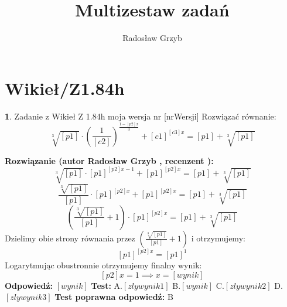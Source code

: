 \documentclass[12pt, a4paper]{article}
\title{Multizestaw zadań}
\author{Radosław Grzyb}
\date{}
\theoremstyle{definition} %
\newtheorem{zad}{}
\newcommand{\kategoria}[1]{\section{#1}} %
\newcommand{\zadStart}[1]{\begin{zad}#1\newline} %
\newcommand{\zadStop}{\end{zad}}   %
\newcommand{\rozwStart}[2]{\noindent \textbf{Rozwiązanie (autor #1 , recenzent #2): }\newline} %
\newcommand{\rozwStop}{\newline}                                            %
\newcommand{\odpStart}{\noindent \textbf{Odpowiedź:}\newline}    %
\newcommand{\odpStop}{\newline}                                             %
\newcommand{\testStart}{\noindent \textbf{Test:}\newline} %
\newcommand{\testStop}{\newline} %
\newcommand{\kluczStart}{\noindent \textbf{Test poprawna odpowiedź:}\newline} %
\newcommand{\kluczStop}{\newline} %
\begin{document}
\maketitle
\kategoria{Wikieł/Z1.84h}
\zadStart{Zadanie z Wikieł Z 1.84h moja wersja nr [nrWersji]}
Rozwiązać równanie:
$$\sqrt[3]{[p1]}\cdot\left(\frac{1}{[c2]}\right)^{\frac{1-[p2]x}{3}}+[c1]^{[c3]x}=[p1]+\sqrt[3]{[p1]}$$
\zadStop
\rozwStart{Radosław Grzyb}{}
$$\sqrt[3]{[p1]}\cdot[p1]^{[p2]x-1}+[p1]^{[p2]x}=[p1]+\sqrt[3]{[p1]}$$
$$\frac{\sqrt[3]{[p1]}}{[p1]}\cdot[p1]^{[p2]x}+[p1]^{[p2]x}=[p1]+\sqrt[3]{[p1]}$$
$$(\frac{\sqrt[3]{[p1]}}{[p1]}+1)\cdot[p1]^{[p2]x}=[p1]+\sqrt[3]{[p1]}$$
Dzielimy obie strony równania przez $(\frac{\sqrt[3]{[p1]}}{[p1]}+1)$ i otrzymujemy:
$$[p1]^{[p2]x}=[p1]^{1}$$
Logarytmując obustronnie otrzymujemy finalny wynik:
$$[p2]x=1\implies x=[wynik]$$
\rozwStop
\odpStart
$[wynik]$
\odpStop
\testStart
A.$[zlywynik1]$
B.$[wynik]$
C.$[zlywynik2]$
D.$[zlywynik3]$
\testStop
\kluczStart
B
\kluczStop
\end{document}
